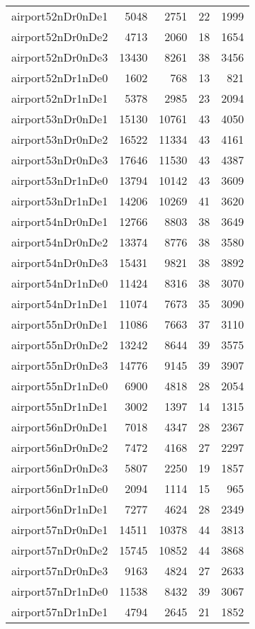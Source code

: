 \begin{longtable}{lrrrr}
airport52nDr0nDe1 & 5048 & 2751 & 22 & 1999 \\
airport52nDr0nDe2 & 4713 & 2060 & 18 & 1654 \\
airport52nDr0nDe3 & 13430 & 8261 & 38 & 3456 \\
airport52nDr1nDe0 & 1602 & 768 & 13 & 821 \\
airport52nDr1nDe1 & 5378 & 2985 & 23 & 2094 \\
airport53nDr0nDe1 & 15130 & 10761 & 43 & 4050 \\
airport53nDr0nDe2 & 16522 & 11334 & 43 & 4161 \\
airport53nDr0nDe3 & 17646 & 11530 & 43 & 4387 \\
airport53nDr1nDe0 & 13794 & 10142 & 43 & 3609 \\
airport53nDr1nDe1 & 14206 & 10269 & 41 & 3620 \\
airport54nDr0nDe1 & 12766 & 8803 & 38 & 3649 \\
airport54nDr0nDe2 & 13374 & 8776 & 38 & 3580 \\
airport54nDr0nDe3 & 15431 & 9821 & 38 & 3892 \\
airport54nDr1nDe0 & 11424 & 8316 & 38 & 3070 \\
airport54nDr1nDe1 & 11074 & 7673 & 35 & 3090 \\
airport55nDr0nDe1 & 11086 & 7663 & 37 & 3110 \\
airport55nDr0nDe2 & 13242 & 8644 & 39 & 3575 \\
airport55nDr0nDe3 & 14776 & 9145 & 39 & 3907 \\
airport55nDr1nDe0 & 6900 & 4818 & 28 & 2054 \\
airport55nDr1nDe1 & 3002 & 1397 & 14 & 1315 \\
airport56nDr0nDe1 & 7018 & 4347 & 28 & 2367 \\
airport56nDr0nDe2 & 7472 & 4168 & 27 & 2297 \\
airport56nDr0nDe3 & 5807 & 2250 & 19 & 1857 \\
airport56nDr1nDe0 & 2094 & 1114 & 15 & 965 \\
airport56nDr1nDe1 & 7277 & 4624 & 28 & 2349 \\
airport57nDr0nDe1 & 14511 & 10378 & 44 & 3813 \\
airport57nDr0nDe2 & 15745 & 10852 & 44 & 3868 \\
airport57nDr0nDe3 & 9163 & 4824 & 27 & 2633 \\
airport57nDr1nDe0 & 11538 & 8432 & 39 & 3067 \\
airport57nDr1nDe1 & 4794 & 2645 & 21 & 1852 \\

\end{longtable}
